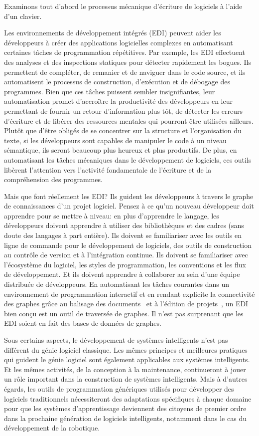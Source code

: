 Examinons tout d'abord le processus mécanique d'écriture de logiciels à l'aide d'un clavier.

Les environnements de développement intégrés (EDI) peuvent aider les développeurs à créer des applications logicielles complexes en automatisant certaines tâches de programmation répétitives. Par exemple, les EDI effectuent des analyses et des inspections statiques pour détecter rapidement les bogues. Ils permettent de compléter, de remanier et de naviguer dans le code source, et ils automatisent le processus de construction, d'exécution et de débogage des programmes. Bien que ces tâches puissent sembler insignifiantes, leur automatisation promet d'accroître la productivité des développeurs en leur permettant de fournir un retour d'information plus tôt, de détecter les erreurs d'écriture et de libérer des ressources mentales qui pourront être utilisées ailleurs. Plutôt que d'être obligés de se concentrer sur la structure et l'organisation du texte, si les développeurs sont capables de manipuler le code à un niveau sémantique, ils seront beaucoup plus heureux et plus productifs. De plus, en automatisant les tâches mécaniques dans le développement de logiciels, ces outils libèrent l'attention vers l'activité fondamentale de l'écriture et de la compréhension des programmes.

Mais que font réellement les EDI? Ils guident les développeurs à travers le graphe de connaissances d'un projet logiciel. Pensez à ce qu'un nouveau développeur doit apprendre pour se mettre à niveau: en plus d'apprendre le langage, les développeurs doivent apprendre à utiliser des bibliothèques et des cadres (sans doute des langages à part entière). Ils doivent se familiariser avec les outils en ligne de commande pour le développement de logiciels, des outils de construction au contrôle de version et à l'intégration continue. Ils doivent se familiariser avec l'écosystème du logiciel, les styles de programmation, les conventions et les flux de développement. Et ils doivent apprendre à collaborer au sein d'une équipe distribuée de développeurs. En automatisant les tâches courantes dans un environnement de programmation interactif et en rendant explicite la connectivité des graphes grâce au balisage des documents~\citep{goldfarb1981generalized} et à l'édition de projets~\citep{voelter2014towards}, un EDI bien conçu est un outil de traversée de graphes. Il n'est pas surprenant que les EDI soient en fait des bases de données de graphes.

Sous certains aspects, le développement de systèmes intelligents n'est pas différent du génie logiciel classique. Les mêmes principes et meilleures pratiques qui guident le génie logiciel sont également applicables aux systèmes intelligents. Et les mêmes activités, de la conception à la maintenance, continueront à jouer un rôle important dans la construction de systèmes intelligents. Mais à d'autres égards, les outils de programmation génériques utilisés pour développer des logiciels traditionnels nécessiteront des adaptations spécifiques à chaque domaine pour que les systèmes d'apprentissage deviennent des citoyens de premier ordre dans la prochaine génération de logiciels intelligents, notamment dans le cas du développement de la robotique.

